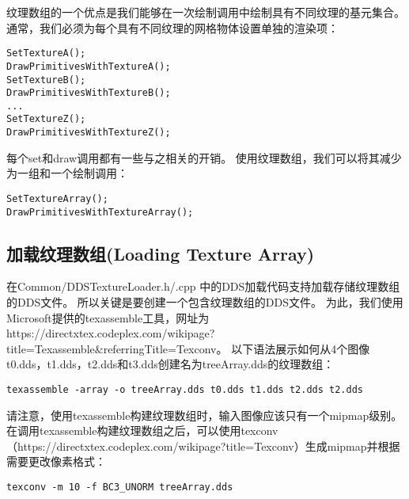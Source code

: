 \begin{flushleft}
纹理数组的一个优点是我们能够在一次绘制调用中绘制具有不同纹理的基元集合。 通常，我们必须为每个具有不同纹理的网格物体设置单独的渲染项：\\
\end{flushleft}

\begin{lstlisting}
SetTextureA();
DrawPrimitivesWithTextureA();
SetTextureB();
DrawPrimitivesWithTextureB();
...
SetTextureZ();
DrawPrimitivesWithTextureZ();
\end{lstlisting}

\begin{flushleft}
每个set和draw调用都有一些与之相关的开销。 使用纹理数组，我们可以将其减少为一组和一个绘制调用：\\
\end{flushleft}

\begin{lstlisting}
SetTextureArray();
DrawPrimitivesWithTextureArray();
\end{lstlisting}

\subsection{加载纹理数组(Loading Texture Array)}
\begin{flushleft}
在Common/DDSTextureLoader.h/.cpp 中的DDS加载代码支持加载存储纹理数组的DDS文件。 所以关键是要创建一个包含纹理数组的DDS文件。 为此，我们使用Microsoft提供的texassemble工具，网址为 https://directxtex.codeplex.com/wikipage?title=Texassemble&referringTitle=Texconv。 以下语法展示如何从4个图像t0.dds，t1.dds，t2.dds和t3.dds创建名为treeArray.dds的纹理数组：\\
\end{flushleft}

\begin{lstlisting}
texassemble -array -o treeArray.dds t0.dds t1.dds t2.dds t2.dds
\end{lstlisting}

\begin{flushleft}
请注意，使用texassemble构建纹理数组时，输入图像应该只有一个mipmap级别。 在调用texassemble构建纹理数组之后，可以使用texconv（https://directxtex.codeplex.com/wikipage?title=Texconv）生成mipmap并根据需要更改像素格式：\\
\end{flushleft}

\begin{lstlisting}
texconv -m 10 -f BC3_UNORM treeArray.dds
\end{lstlisting}

